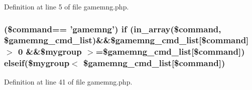 Definition at line 5 of file gamemng.\+php.

\hypertarget{gamemng_8php_ab99a9358802fac6b0d0baa309cf1b001}{
\subsubsection[{elseif}]{ (\$command== 'gamemng') {\bf if} (in\+\_\+array(\$command, \$gamemng\+\_\+cmd\+\_\+list)\&\&\$gamemng\+\_\+cmd\+\_\+list\mbox{[}\$command\mbox{]} $>$ 0 \&\&\$mygroup $>$=\$gamemng\+\_\+cmd\+\_\+list\mbox{[}\$command\mbox{]}) elseif(\$mygroup$<$ \$gamemng\+\_\+cmd\+\_\+list\mbox{[}\$command\mbox{]})}}\label{gamemng_8php_ab99a9358802fac6b0d0baa309cf1b001}


Definition at line 41 of file gamemng.\+php.

